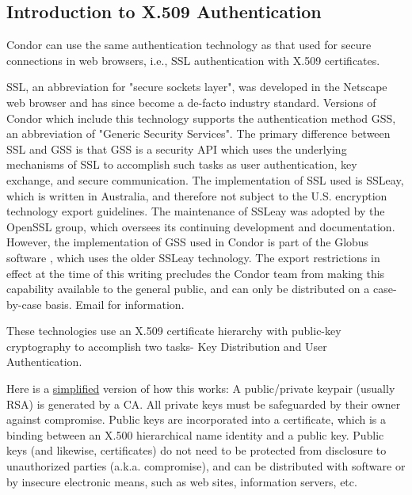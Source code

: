 \subsection{\label{sec:General-X509-Authentication}Introduction to X.509 
Authentication}

Condor can use the same authentication technology as that used for secure
connections in web browsers, i.e., SSL authentication with X.509 certificates.

SSL, an abbreviation for "secure sockets layer", was developed in the 
Netscape web browser and has since become a de-facto industry standard.
Versions of Condor which include this technology supports the authentication
method GSS, an abbreviation of "Generic Security Services". The
primary difference between SSL and GSS is that GSS is a security API which
uses the underlying mechanisms of SSL to accomplish such tasks as user
authentication, key exchange, and secure communication. The implementation
of SSL used is SSLeay, which is written in Australia, and therefore not
subject to the U.S. encryption technology export guidelines. The maintenance
of SSLeay was adopted by the OpenSSL group, which oversees its continuing
development and documentation. However, the implementation of GSS used in
Condor is part of the Globus software , which uses the 
older SSLeay technology. The export restrictions in effect at the time of
this writing precludes the Condor team from making this capability available
to the general public, and can only be distributed on a case-by-case basis.
Email  for information.

These technologies use an X.509 certificate hierarchy with public-key 
cryptography to accomplish two tasks- Key Distribution and User Authentication.

Here is a \underline{simplified} version of how this works:
A public/private keypair (usually RSA) is generated by a CA. All private
keys must be safeguarded by their owner against compromise. Public keys are
incorporated into a certificate, which is a binding between an X.500
hierarchical name identity and a public key. Public keys (and likewise,
certificates) do not need to be protected from disclosure to unauthorized
parties (a.k.a. compromise), and can be distributed with software or by
insecure electronic means, such as web sites, information servers, etc.

